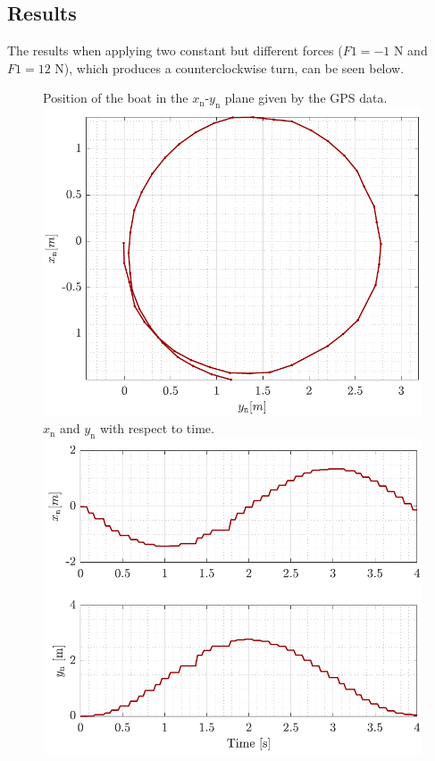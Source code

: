\subsection*{Results}
The results when applying two constant but different forces ($F1=-1$ N and $F1=12$ N), which produces a counterclockwise turn, can be seen below.
\begin{figure}[H]
    \captionbox 
    {   
        Position of the boat in the $x_\mathrm{n}$-$y_\mathrm{n}$ plane given by the GPS data.
        \label{fig:turn_app}
    }                                                                 
    {                                                                  
        \includegraphics[width=.45\textwidth]{figures/turn_app}         
    }                                                                    
    \hspace{5pt}                                                          
    \captionbox  
    {      
        $x_\mathrm{n}$ and $y_\mathrm{n}$ with respect to time.
        \label{fig:turn_time_app}
    }                                                                          
    {
        \includegraphics[width=.45\textwidth]{figures/turn_time_app}
    }
\end{figure}